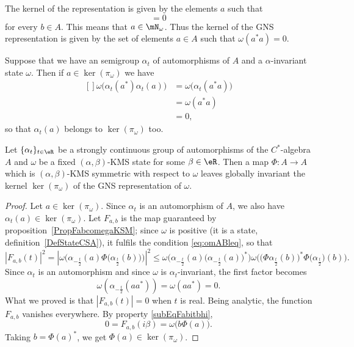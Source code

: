 The kernel of the representation is given by the elements $a$ such that
\begin{equation}
	[ab]=0
\end{equation}
for every $b\in A$. This means that $a\in\mN_{\omega}$. Thus the kernel of the GNS representation is given by the set of elements $a\in A$ such that $\omega(a^*a)=0$.

Suppose that we have an semigroup $\alpha_t$ of automorphisms of $A$ and a $\alpha$-invariant state $\omega$. Then if $a\in\ker(\pi_{\omega})$ we have
\begin{equation}
	\begin{aligned}[]
		\omega\big( \alpha_t(a^*)\alpha_t(a) \big)&=\omega\big( \alpha_t(a^*a) \big)\\
		&=\omega(a^*a)\\
		&=0,
	\end{aligned}
\end{equation}
so that $\alpha_t(a)$ belongs to $\ker(\pi_{\omega})$ too.

\begin{proposition}
	Let $\{ \alpha_t \}_{t\in\eR}$ be a strongly continuous group of automorphisms of the $C^*$-algebra $A$ and $\omega$ be a fixed $(\alpha,\beta)$-KMS state for some $\beta\in\eR$. Then a map $\Phi\colon A\to A$ which is $(\alpha,\beta)$-KMS symmetric with respect to $\omega$ leaves globally invariant the kernel $\ker(\pi_{\omega})$ of the GNS representation of $\omega$.
\end{proposition}

\begin{proof}
	Let $a\in\ker(\pi_{\omega})$. Since $\alpha_t$ is an automorphism of $A$, we also have $\alpha_t(a)\in\ker(\pi_{\omega})$. Let $F_{a,b}$ is the map guaranteed by proposition~\ref{PropFabcomegaKSM}; since $\omega$ is positive (it is a state, definition~\ref{DefStateCSA}), it fulfils the condition \eqref{eq:omABleq}, so that
	\begin{equation}
		| F_{a,b}(t) |^2=|\omega\Big( \alpha_{-\frac{ t }{2}}(a)\Phi\big( \alpha_{\frac{ t }{ 2 }}(b) \big) \Big)|^2\leq \omega\Big( \alpha_{-\frac{ t }{2}}(a)\big( \alpha_{-\frac{ t }{2}}(a) \big)^* \Big)\omega\Big(  \big(\Phi \alpha_{\frac{ t }{2}}(b) \big)^*\Phi\big( \alpha_{\frac{ t }{2}} \big)(b) \Big).
	\end{equation}
	Since $\alpha_t$ is an automorphism and since $\omega$ is $\alpha_t$-invariant, the first factor becomes
	\begin{equation}
		\omega(\alpha_{-\frac{ t }{2}}(aa^*))=\omega(aa^*)=0.
	\end{equation}
	What we proved is that $| F_{a,b}(t) |=0$ when $t$ is real. Being analytic, the function $F_{a,b}$ vanishes everywhere. By property \eqref{subEqFabitbhi},
	\begin{equation}
		0=F_{a,b}(i\beta)=\omega\big( b\Phi(a) \big).
	\end{equation}
	Taking $b=\Phi(a)^*$, we get $\Phi(a)\in\ker(\pi_{\omega})$.
\end{proof}


